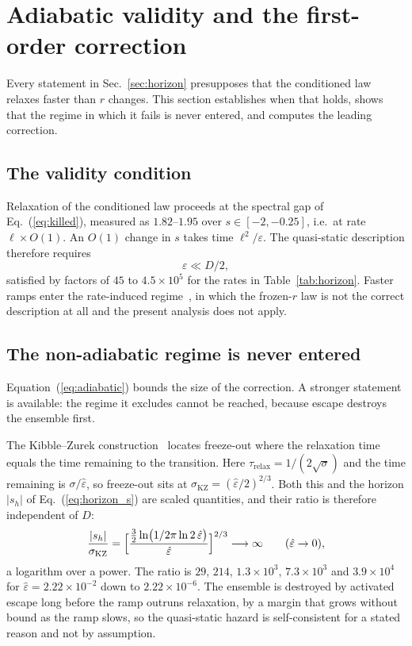 \documentclass[%
 aip,
 cha,
 amsmath,amssymb,
 reprint,
 superscriptaddress,
 floatfix,
]{revtex4-2}
\newcommand{\Sig}{\hat\varepsilon}
\begin{document}
\section{\label{sec:lag}Adiabatic validity and the first-order correction}

Every statement in Sec.~\ref{sec:horizon} presupposes that the conditioned law relaxes faster than $r$ changes.  This section establishes when that holds, shows that the regime in which it fails is never entered, and computes the leading correction.

\subsection{The validity condition}

Relaxation of the conditioned law proceeds at the spectral gap of Eq.~(\ref{eq:killed}), measured as $1.82$--$1.95$ over $s\in[-2,-0.25]$, i.e.\ at rate $\ell\times O(1)$.  An $O(1)$ change in $s$ takes time $\ell^2/\varepsilon$.  The quasi-static description therefore requires
\begin{equation}
\label{eq:adiabatic}
\varepsilon\ll D/2,
\end{equation}
satisfied by factors of $45$ to $4.5\times10^{5}$ for the rates in Table~\ref{tab:horizon}.  Faster ramps enter the rate-induced regime~\cite{Ashwin2012,Ritchie2016,Alkhayuon2019}, in which the frozen-$r$ law is not the correct description at all and the present analysis does not apply.

\subsection{\label{sec:kz}The non-adiabatic regime is never entered}

Equation~(\ref{eq:adiabatic}) bounds the size of the correction.  A stronger statement is available: the regime it excludes cannot be reached, because escape destroys the ensemble first.

The Kibble--Zurek construction~\cite{Kibble1976,Zurek1985,delCampoZurek2014} locates freeze-out where the relaxation time equals the time remaining to the transition.  Here $\tau_{\mathrm{relax}}=1/(2\sqrt\sigma)$ and the time remaining is $\sigma/\Sig$, so freeze-out sits at $\sigma_{\mathrm{KZ}}=(\Sig/2)^{2/3}$.  Both this and the horizon $|s_h|$ of Eq.~(\ref{eq:horizon_s}) are scaled quantities, and their ratio is therefore independent of $D$:
\begin{equation}
\label{eq:kzratio}
\frac{|s_h|}{\sigma_{\mathrm{KZ}}}
=\Bigl[\frac{\tfrac32\ln\bigl(1/2\pi\ln2\,\Sig\bigr)}{\Sig}\Bigr]^{2/3}
\longrightarrow\infty
\qquad(\Sig\to0),
\end{equation}
a logarithm over a power.  The ratio is $29$, $214$, $1.3\times10^3$, $7.3\times10^3$ and $3.9\times10^4$ for $\Sig=2.22\times10^{-2}$ down to $2.22\times10^{-6}$.  The ensemble is destroyed by activated escape long before the ramp outruns relaxation, by a margin that grows without bound as the ramp slows, so the quasi-static hazard is self-consistent for a stated reason and not by assumption.
\end{document}

